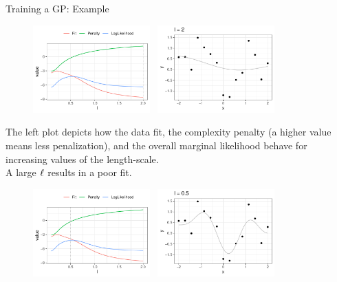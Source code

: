 \begin{frame}[c,allowframebreaks]{Training a GP: Example}
\begin{figure}
	\includegraphics[width = 0.4\textwidth]{figure_man/training/fit-vs-penalty-2.pdf}~	\includegraphics[width = 0.4\textwidth]{figure_man/training/datapoints-2.pdf}
\end{figure}

\begin{footnotesize}
\textcolor{blue}{\faInfoCircle} The left plot depicts how the data fit, the complexity penalty (a higher value means less penalization), and the overall marginal likelihood behave for increasing values of the length-scale.\\
\vspace{3mm}
\textcolor{blue}{\faLightbulbO} A large $\ell$ results in a poor fit.
\end{footnotesize}


\framebreak

\begin{figure}
	\includegraphics[width = 0.4\textwidth]{figure_man/training/fit-vs-penalty-0_5.pdf}~	\includegraphics[width = 0.4\textwidth]{figure_man/training/datapoints-0_5.pdf}
\end{figure}



\end{frame}
